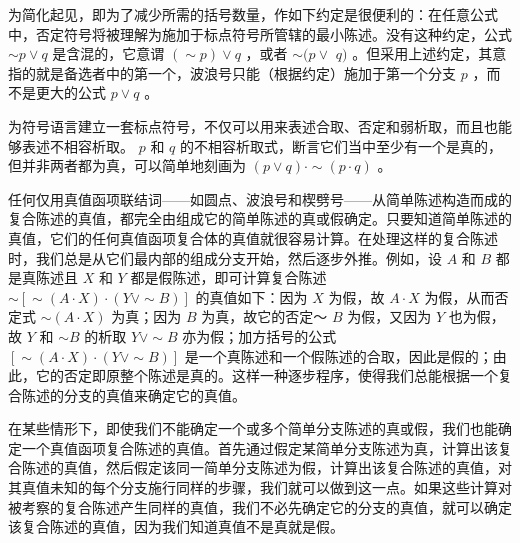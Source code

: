 为简化起见，即为了减少所需的括号数量，作如下约定是很便利的：在任意公式中，否定符号将被理解为施加于标点符号所管辖的最小陈述。没有这种约定，公式 $\sim p \vee q$ 是含混的，它意谓 $(\sim p) \vee q$ ，或者 $\sim(p \vee$ $q)$ 。但采用上述约定，其意指的就是备选者中的第一个，波浪号只能（根据约定）施加于第一个分支 $p$ ，而不是更大的公式 $p \vee q$ 。

为符号语言建立一套标点符号，不仅可以用来表述合取、否定和弱析取，而且也能够表述不相容析取。 $p$ 和 $q$ 的不相容析取式，断言它们当中至少有一个是真的，但并非两者都为真，可以简单地刻画为 $(p \vee q) \cdot \sim(p \cdot q)$ 。

任何仅用真值函项联结词——如圆点、波浪号和楔劈号——从简单陈述构造而成的复合陈述的真值，都完全由组成它的简单陈述的真或假确定。只要知道简单陈述的真值，它们的任何真值函项复合体的真值就很容易计算。在处理这样的复合陈述时，我们总是从它们最内部的组成分支开始，然后逐步外推。例如，设 $A$ 和 $B$ 都是真陈述且 $X$ 和 $Y$ 都是假陈述，即可计算复合陈述 $\sim[\sim(A \cdot X) \cdot(Y \vee \sim B)]$ 的真值如下：因为 $X$ 为假，故 $A \cdot X$ 为假，从而否定式 $\sim(A \cdot X)$ 为真；因为 $B$ 为真，故它的否定～ $B$ 为假，又因为 $Y$ 也为假，故 $Y$ 和 $\sim B$ 的析取 $Y \vee \sim B$ 亦为假；加方括号的公式 $[\sim(A \cdot X) \cdot(Y \vee \sim B)]$ 是一个真陈述和一个假陈述的合取，因此是假的；由此，它的否定即原整个陈述是真的。这样一种逐步程序，使得我们总能根据一个复合陈述的分支的真值来确定它的真值。

在某些情形下，即使我们不能确定一个或多个简单分支陈述的真或假，我们也能确定一个真值函项复合陈述的真值。首先通过假定某简单分支陈述为真，计算出该复合陈述的真值，然后假定该同一简单分支陈述为假，计算出该复合陈述的真值，对其真值未知的每个分支施行同样的步骤，我们就可以做到这一点。如果这些计算对被考察的复合陈述产生同样的真值，我们不必先确定它的分支的真值，就可以确定该复合陈述的真值，因为我们知道真值不是真就是假。

